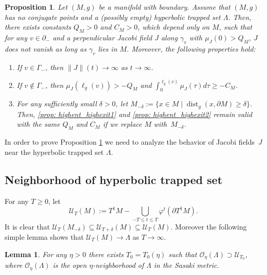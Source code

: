\documentclass[JEP,XML,SOM,Unicode,NoFloatCountersInSection]{cedram}
\let\sep\mid
\newcommand{\elg}{\ell_g}
\DeclareMathOperator{\dist}{dist}
\newtheorem{lemma}[theorem]{Lemma}
\newtheorem{proposition}[theorem]{Proposition}
\theoremstyle{definition}
\let\phi\varphi
\renewcommand{\>}{{\rangle}}
\newcommand{\<}{{\langle}}
\begin{document}
\begin{proposition}\label{prop: highent_highexit}
Let $(M, g)$ be a manifold with boundary. Assume that $(M, g)$ has no conjugate points and a (possibly empty) hyperbolic trapped set $\Lambda$. Then, there exists constants $Q_M>0$ and $ C_M>0$, which depend only on $M$, such that for any $v\in\partial_-$ and a perpendicular Jacobi field $J$ along $\gamma_v$ with $\mu_J(0)>Q_M$, $J$ does not vanish as long as $\gamma_v$ lies in $M$. Moreover, the following properties hold:
\begin{enumerate}
\item\label{prop: highent_highexit1}
If $v\in \Gamma_-$, then $\|J\|(t)\to\infty$ as $t\to\infty$.

\item\label{prop: highent_highexit2}
If $v\notin \Gamma_-$, then $\mu_J(\elg(v))>-Q_M$ and $\int_0^{\elg(v)}\mu_J(\tau)d\tau\geq -C_M$.

\item\label{prop: highent_highexit3}
For any sufficiently small $\delta>0$, let $M_{-\delta}:=\{x\in M\sep \dist_g(x,\partial M)\geq \delta\}$. Then, \eqref{prop: highent_highexit1} and \eqref{prop: highent_highexit2} remain valid with the same $Q_M$ and $ C_M$ if we replace $M$ with~$M_{-\delta}$.
\end{enumerate}
\end{proposition}

In order to prove Proposition \ref{prop: highent_highexit} we need to analyze the behavior of Jacobi fields~$J$ near the hyperbolic trapped set $\Lambda$.

\subsection{Neighborhood of hyperbolic trapped set}
For any $T\geq 0$, let
\[
\mathcal U_T(M) := T^1M-\bigcup_{-T\leq t\leq T}\phi^t(\partial T^1M).
\]
It is clear that $\mathcal U_T(M_{-\delta})\subseteq \mathcal U_{T+\delta}(M)\subseteq \mathcal U_{T}(M)$. Moreover the following simple lemma shows that $\mathcal U_T(M)\to\Lambda$ as $T\to \infty$.

\begin{lemma}\label{lemma_nbh_of_trapping_set}
For any $\eta>0$ there exists $T_0=T_0(\eta)$ such that $\mathcal O_{\eta}(\Lambda)\supset\mathcal U_{T_0}$, where $\mathcal O_{\eta}(\Lambda)$ is the open $\eta$-neighborhood of $\Lambda$ in the Sasaki metric.
\end{lemma}
\end{document}
